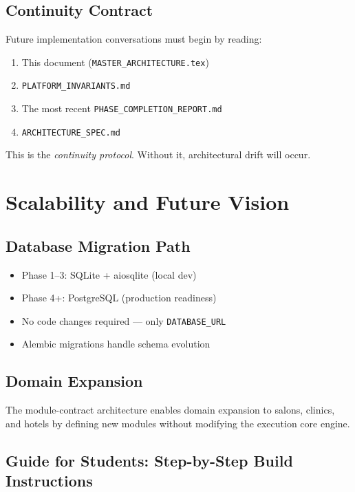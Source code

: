 \documentclass[12pt, a4paper]{report}
\begin{document}
\section{Continuity Contract}

Future implementation conversations must begin by reading:
\begin{enumerate}
  \item This document (\texttt{MASTER\_ARCHITECTURE.tex})
  \item \texttt{PLATFORM\_INVARIANTS.md}
  \item The most recent \texttt{PHASE\_COMPLETION\_REPORT.md}
  \item \texttt{ARCHITECTURE\_SPEC.md}
\end{enumerate}

This is the \textit{continuity protocol}. Without it, architectural drift will occur.

\chapter{Scalability and Future Vision}

\section{Database Migration Path}

\begin{itemize}
  \item Phase 1--3: SQLite + aiosqlite (local dev)
  \item Phase 4+: PostgreSQL (production readiness)
  \item No code changes required — only \texttt{DATABASE\_URL}
  \item Alembic migrations handle schema evolution
\end{itemize}

\section{Domain Expansion}

The module-contract architecture enables domain expansion to salons, clinics, and hotels by defining new modules without modifying the execution core engine.

\section{Guide for Students: Step-by-Step Build Instructions}
\end{document}
